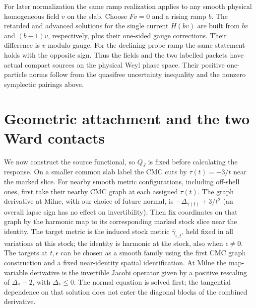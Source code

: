 \documentclass[11pt]{article}
\numberwithin{equation}{section}
\begin{document}
For later normalization the same ramp realization applies to
any smooth physical homogeneous field \(v\) on the slab.
Choose \(Fv=0\) and a rising ramp \(b\). The retarded
and advanced solutions for the single current \(H(bv)\)
are built from \(bv\) and \((b-1)v\), respectively, plus
their one-sided gauge corrections. Their difference is
\(v\) modulo gauge. For the declining probe ramp the same
statement holds with the opposite sign. Thus the fields
and the two labelled packets have actual compact sources
on the physical Weyl phase space. Their positive
one-particle norms follow from the quasifree uncertainty
inequality and the nonzero symplectic pairings above.

\section{Geometric attachment and the two Ward contacts}

We now construct the source functional, so \(Q_J\) is fixed
before calculating the response. On a smaller common slab
label the CMC cuts by \(\tau(t)=-3/t\) near the marked slice.
For nearby smooth metric configurations, including off-shell
ones, first take their nearby CMC graph at each assigned
\(\tau(t)\). The graph derivative at Milne, with our choice
of future normal, is \(-\Delta_{\gamma(t)}+3/t^2\) (an
overall lapse sign has no effect on invertibility). Then fix
coordinates on that graph by the harmonic map to its
corresponding marked stock slice near the identity. The target
metric is the induced stock metric \(\bar\gamma_{\epsilon,t}\),
held fixed in all variations at this stock; the identity is
harmonic at the stock, also when \(\epsilon\ne0\). The targets
at \(t,\epsilon\) can be chosen as a smooth family using the
first CMC graph construction and a fixed near-identity spatial
identification. At Milne the map-variable derivative is the
invertible Jacobi operator given by a positive rescaling of
\(\Delta_*-2\), with \(\Delta_*\le0\). The normal equation
is solved first; the tangential dependence on that solution
does not enter the diagonal blocks of the combined derivative.
\end{document}
